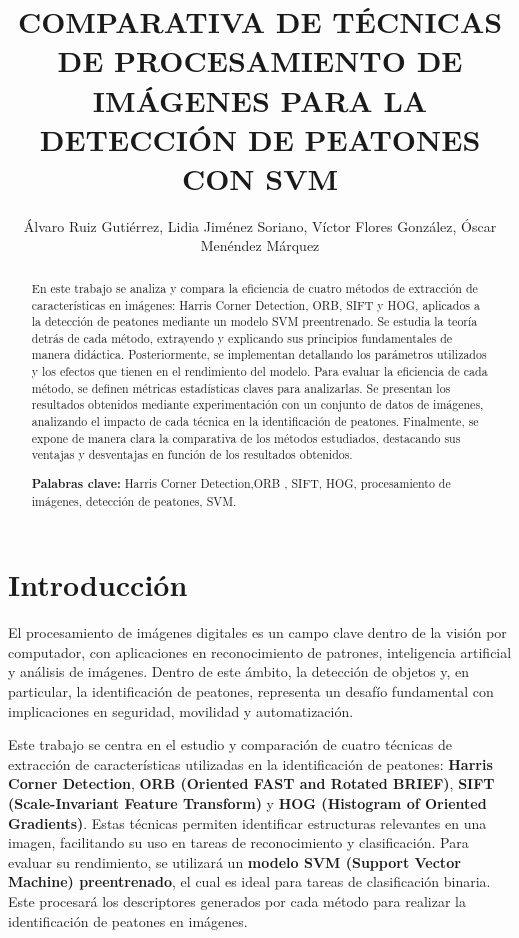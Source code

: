 \documentclass[a4paper]{article}
\title{COMPARATIVA DE TÉCNICAS DE PROCESAMIENTO DE IMÁGENES PARA LA DETECCIÓN DE PEATONES CON SVM}
\author{Álvaro Ruiz Gutiérrez, Lidia Jiménez Soriano, Víctor Flores González, Óscar Menéndez Márquez}
\begin{document}
\maketitle

\begin{abstract}
  \noindent En este trabajo se analiza y compara la eficiencia de cuatro métodos de extracción de características en imágenes: Harris Corner Detection, ORB, SIFT y HOG, aplicados a la detección de peatones mediante un modelo SVM preentrenado. 
  Se estudia la teoría detrás de cada método, extrayendo y explicando sus principios fundamentales de manera didáctica. Posteriormente, se implementan detallando los parámetros utilizados y los efectos que tienen en el rendimiento del modelo. Para evaluar la eficiencia de cada método, se definen métricas estadísticas claves para analizarlas. 
  Se presentan los resultados obtenidos mediante experimentación con un conjunto de datos de imágenes, analizando el impacto de cada técnica en la identificación de peatones. Finalmente, se expone de manera clara la 
  comparativa de los métodos estudiados, destacando sus ventajas y desventajas en función de los resultados obtenidos.  
 
 \hspace{1cm}
 
 \noindent \textbf{Palabras clave:} 
 Harris Corner Detection,ORB , SIFT, HOG, procesamiento de imágenes, detección de peatones, SVM.
 \end{abstract}
 


 \section{Introducción}

 El procesamiento de imágenes digitales es un campo clave dentro de la visión por computador, con aplicaciones en reconocimiento de patrones, inteligencia artificial y análisis de imágenes. Dentro de este ámbito, la detección de objetos y, en particular, la identificación de peatones, representa un desafío fundamental con implicaciones en seguridad, movilidad y automatización. 
 \par \hspace{1cm}

 Este trabajo se centra en el estudio y comparación de cuatro técnicas de extracción de características utilizadas en la identificación de peatones: \textbf{Harris Corner Detection}, \textbf{ORB (Oriented FAST and Rotated BRIEF)}, \textbf{SIFT (Scale-Invariant Feature Transform)} y \textbf{HOG (Histogram of Oriented Gradients)}. Estas técnicas permiten identificar estructuras relevantes en una imagen, facilitando su uso en tareas de reconocimiento y clasificación. Para evaluar su rendimiento, se utilizará un 
 \textbf{modelo SVM (Support Vector Machine) preentrenado}, el cual es ideal para tareas de clasificación binaria. Este procesará los descriptores generados por cada método para realizar la identificación de peatones en imágenes. 
 \par \hspace{1cm}
\end{document}
